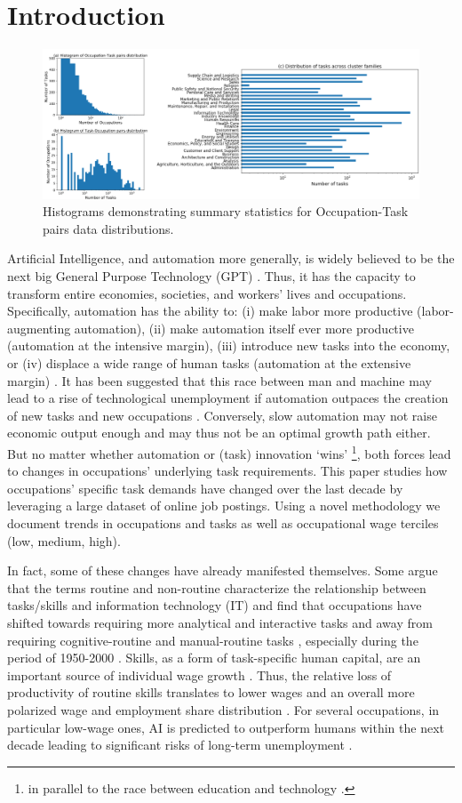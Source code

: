 \documentclass[letterpaper]{article} %
\begin{document}
\section{Introduction}
\label{sec:intro}
\begin{figure}[h!]
\centering
\includegraphics[width=0.85\linewidth]{combined_stats.png}
\caption{Histograms demonstrating summary statistics for Occupation-Task pairs data distributions.}
\label{fig:Skill2SOC}
\end{figure}
Artificial Intelligence, and automation more generally, is widely believed to be the next big General Purpose Technology (GPT) \cite{Brynjolfsson2018b}. Thus, it has the capacity to transform entire economies, societies, and workers' lives and occupations. Specifically, automation has the ability to: (i) make labor more productive (labor-augmenting automation), (ii) make automation itself ever more productive (automation at the intensive margin), (iii) introduce new tasks into the economy, or (iv) displace a wide range of human tasks (automation at the extensive margin) \cite{Acemoglu2019}. It has been suggested that this race between man and machine may lead to a rise of technological unemployment if automation outpaces the creation of new tasks and new occupations \cite{Acemoglu2018c}. Conversely, slow automation may not raise economic output enough and may thus not be an optimal growth path either. But no matter whether automation or (task) innovation `wins' \footnote{in parallel to the race between education and technology \cite{Goldin2007}.}, both forces lead to changes in occupations' underlying task requirements. This paper studies how occupations' specific task demands have changed over the last decade by leveraging a large dataset of online job postings. Using a novel methodology we document trends in occupations and tasks as well as occupational wage terciles (low, medium, high).
\par
In fact, some of these changes have already manifested themselves. Some argue that the terms routine and non-routine characterize the relationship between tasks/skills and information technology (IT) and find that occupations have shifted towards requiring more analytical and interactive tasks and away from requiring cognitive-routine and manual-routine tasks \cite{Spitz-Oener2006}, especially during the period of 1950-2000 \cite{atalay2019evolution}. Skills, as a form of task-specific human capital, are an important source of individual wage growth \cite{Gathmann2010}. Thus, the relative loss of productivity of routine skills translates to lower wages and an overall more polarized wage and employment share distribution \cite{AutorDorn2013}. For several occupations, in particular low-wage ones, AI is predicted to outperform humans within the next decade  leading to significant risks of long-term unemployment \cite{grace2018will} \cite{depredicting}.
\end{document}
